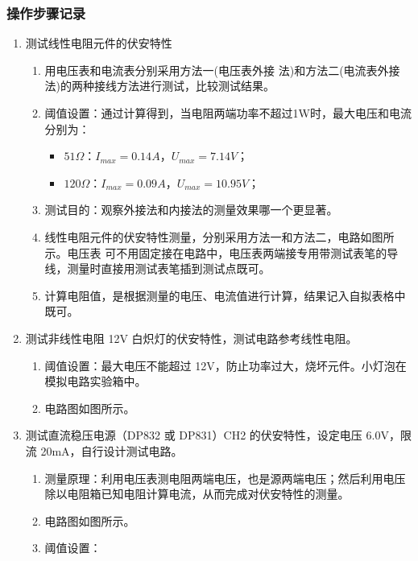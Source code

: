 \documentclass[dvipsnames, svgnames,a4paper,11pt]{article}
\begin{document}
	\subsubsection{操作步骤记录}
	\begin{enumerate}
		
		\item 测试线性电阻元件的伏安特性
		\begin{enumerate}
			\item 用电压表和电流表分别采用方法一(电压表外接 法)和方法二(电流表外接法)的两种接线方法进行测试，比较测试结果。
			\item 阈值设置：通过计算得到，当电阻两端功率不超过1W时，最大电压和电流分别为：
			\begin{itemize}
				\item $51\Omega$：$I_{max}=0.14A$，$U_{max}=7.14V$；
				\item $120\Omega$：$I_{max}=0.09A$，$U_{max}=10.95V$；
			\end{itemize}
			\item 测试目的：观察外接法和内接法的测量效果哪一个更显著。
			\item 线性电阻元件的伏安特性测量，分别采用方法一和方法二，电路如图所示。电压表 可不用固定接在电路中，电压表两端接专用带测试表笔的导线，测量时直接用测试表笔插到测试点既可。
			\item 计算电阻值，是根据测量的电压、电流值进行计算，结果记入自拟表格中既可。
		\end{enumerate}
		
		\item 测试非线性电阻 12V 白炽灯的伏安特性，测试电路参考线性电阻。
		\begin{enumerate}
			\item 阈值设置：最大电压不能超过 12V，防止功率过大，烧坏元件。小灯泡在模拟电路实验箱中。
			\item 电路图如图所示。
		\end{enumerate}
		
		\item 测试直流稳压电源（DP832 或 DP831）CH2 的伏安特性，设定电压 6.0V，限流 20mA，自行设计测试电路。
		\begin{enumerate}
			\item 测量原理：利用电压表测电阻两端电压，也是源两端电压；然后利用电压除以电阻箱已知电阻计算电流，从而完成对伏安特性的测量。
			\item 电路图如图所示。
			\item 阈值设置：
		\end{enumerate}
		

\end{enumerate}
\end{document}
